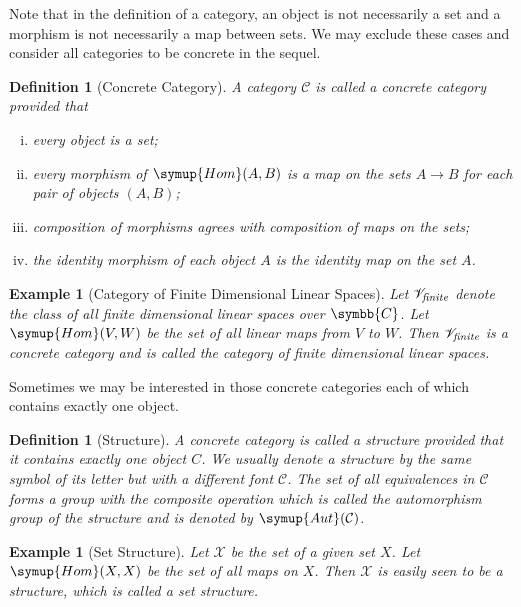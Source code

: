 \documentclass{assignment}[2019/10/15]
\theoremstyle{plain}
\newtheorem{definition}[theorem]{Definition}
\newtheorem{example}[theorem]{Example}
\newcommand{\SC}{\mathscr{C}}
\newcommand{\BC}{\symbb{C}}
\newcommand{\Hom}{\mathop{}\!\symup{Hom}}
\newcommand{\Aut}{\mathop{}\!\symup{Aut}}
\numberwithin{equation}{section}
\begin{document}
    Note that in the definition of a category, an object is not necessarily a set and a morphism is not necessarily a map between sets. We may exclude these cases and consider all categories to be concrete in the sequel.

    \begin{definition}[Concrete Category]
        A category $\SC$ is called a \emph{concrete category} provided that
        \begin{enumerate}[(i)]
            \item every object is a set;
            \item every morphism of $\Hom(A, B)$ is a map on the sets $A\to B$ for each pair of objects $(A, B)$;
            \item composition of morphisms agrees with composition of maps on the sets;
            \item the identity morphism of each object $A$ is the identity map on the set $A$.
        \end{enumerate}
    \end{definition}

    \begin{example}[Category of Finite Dimensional Linear Spaces]
        Let $\mathscr{V}_\text{\it finite}$ denote the class of all finite dimensional linear spaces over $\BC$. Let $\Hom(V, W)$ be the set of all linear maps from $V$ to $W$. Then $\mathscr{V}_\text{\it finite}$ is a concrete category and is called the \emph{category of finite dimensional linear spaces}.
    \end{example}

    Sometimes we may be interested in those concrete categories each of which contains exactly one object.

    \begin{definition}[Structure]
        A concrete category is called a \emph{structure} provided that it contains exactly one object $C$. We usually denote a structure by the same symbol of its letter but with a different font $\mathcal{C}$. The set of all equivalences in $\mathcal{C}$ forms a group with the composite operation which is called the \emph{automorphism group} of the structure and is denoted by $\Aut(\mathcal{C})$.
    \end{definition}

    \begin{example}[Set Structure]
        Let $\mathcal{X}$ be the set of a given set $X$. Let $\Hom(X, X)$ be the set of all maps on $X$. Then $\mathcal{X}$ is easily seen to be a structure, which is called a \emph{set structure}.
    \end{example}
\end{document}

